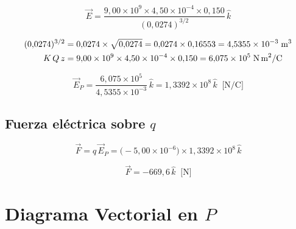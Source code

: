 \documentclass[12pt,letterpaper]{article}
\begin{document}
\begin{equation*}
    \vec{E}
    = \frac{9{,}00\times10^9 \times 4{,}50\times10^{-4} \times 0{,}150}
           {(0{,}0274)^{3/2}}\,\hat{k}
\end{equation*}

\begin{align*}
    (0{,}0274)^{3/2} &= 0{,}0274\times\sqrt{0{,}0274} = 0{,}0274\times0{,}16553 = 4{,}5355\times10^{-3}\;\text{m}^3\\
    K\,Q\,z &= 9{,}00\times10^9 \times 4{,}50\times10^{-4} \times 0{,}150 = 6{,}075\times10^5\;\text{N\,m}^2/\text{C}
\end{align*}

\begin{equation*}
    \boxed{\vec{E}_P = \frac{6{,}075\times10^5}{4{,}5355\times10^{-3}}\,\hat{k}
    = 1{,}3392\times10^{8}\,\hat{k}\;\;\text{[N/C]}}
\end{equation*}

\subsection*{Fuerza el\'ectrica sobre $q$}

\begin{equation*}
    \vec{F} = q\,\vec{E}_P
    = \bigl(-5{,}00\times10^{-6}\bigr)\times1{,}3392\times10^{8}\,\hat{k}
\end{equation*}

\begin{equation*}
    \boxed{\vec{F} = -669{,}6\,\hat{k}\;\;\text{[N]}}
\end{equation*}

\section*{Diagrama Vectorial en $P$}
\end{document}
